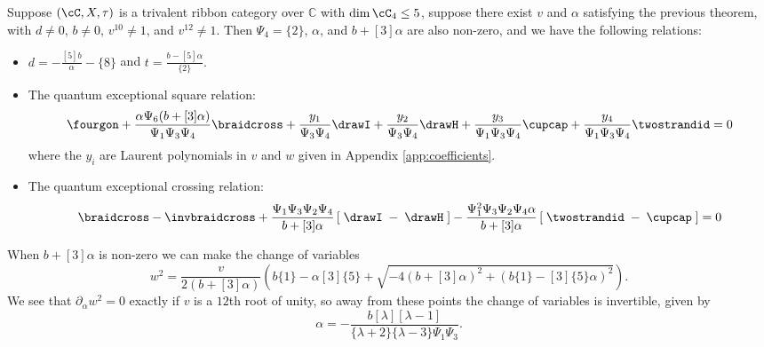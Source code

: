 \documentclass[12pt]{amsart}
\begin{document}
\begin{theorem}\label{thm:square-crossing}
Suppose $(\cC, X, \tau)$ is a trivalent ribbon category over $\mathbb{C}$ with
$\dim{\cC_4} \leq 5$, suppose there exist $v$ and $\alpha$ satisfying the
previous theorem, with $d \neq 0 $, $b \neq 0$, $v^{10} \neq 1$, and $v^{12}
\neq 1$.  Then $\Psi_4 = \{2\}$, $\alpha$, and $b+[3]\alpha$ are
also non-zero, and we have the following relations:
\begin{itemize}
\item
$
  d = -\frac{[5] b}{\alpha} - \{8\} 
$
and
$
  t = \frac{b-[5] \alpha}{\{2\}}.
$
\item

The quantum exceptional square relation:
\begin{equation*} \fourgon + \frac{\alpha \Psi_6 (b+[3]\alpha)}{\Psi_1 \Psi_3 \Psi_4}  \braidcross + \frac{y_1}{\Psi_3 \Psi_4}  \drawI + \frac{y_2}{\Psi_3 \Psi_4}  \drawH + \frac{y_3}{\Psi_1 \Psi_3 \Psi_4} \cupcap + \frac{y_4}{\Psi_1 \Psi_3 \Psi_4} \twostrandid =0
\end{equation*}
where the $y_i$ are Laurent polynomials in $v$ and $w$ given in Appendix \ref{app:coefficients}.
\item
The quantum exceptional crossing relation:
\begin{equation*}
\braidcross - \invbraidcross + \frac{\Psi_1 \Psi_3 \Psi_2 \Psi_4}{b+[3]\alpha} \left[\; \drawI \; - \; \drawH \; \right] - \frac{\Psi_1^2 \Psi_3 \Psi_2 \Psi_4 \alpha}{b+[3]\alpha} \left[\; \twostrandid \; - \; \cupcap \; \right] = 0
\end{equation*}
\end{itemize}

\end{theorem}


When $b+[3]\alpha$ is non-zero 
we can make the change of variables
\begin{equation}\label{eq:change-variables}
  w^2 = \frac{v}{2(b+[3]\alpha)}\left(b \{1\} -\alpha [3] \{5\} + \sqrt{-4 (b+[3]\alpha)^2 + (b \{1\} -[3]\{5\}\alpha)^2} \right).
\end{equation}
We see that $\partial_\alpha w^2 = 0$ exactly if $v$ is a $12$th root of
unity, so away from these points the change of variables is invertible, given
by
$$\alpha =  -\frac{b[\lambda][\lambda-1]}{\{\lambda+2\}\{\lambda-3\}\Psi_1\Psi_3}.$$
\end{document}
